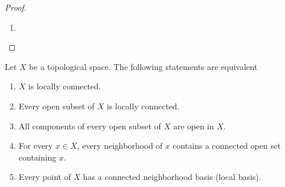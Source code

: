 \begin{proof}
\begin{enumerate}[label={(\alph*)}]
\begin{enumerate}[label={\textbf{Case \arabic*.}},itemindent=1cm]
			            There exists $\varepsilon > 0$ such that $\openinterval{t - \varepsilon, t + \varepsilon} \subseteq \halfopenleft{-1, 0}$. The open intervals $\openinterval{\tuple{x, t - \varepsilon}, \tuple{x, t + \varepsilon}}$ and $\openinterval{t - \varepsilon, t + \varepsilon}$ are homeomorphic due to the homeomorphism $\varphi: \openinterval{t - \varepsilon, t + \varepsilon} \to \openinterval{\tuple{x, t - \varepsilon}, \tuple{x, t + \varepsilon}}$ given by $\varphi(s) = \tuple{x, s}$.
			      \item $t = 0$ and $x > y_{0}$
			      \item $t = 0$ and $x = y_{0}$

			            For every $0 < \varepsilon < 1$, $\halfopenleft{\tuple{y_{0}, -\varepsilon}, \tuple{y_{0}, 0}} \vee \halfopenright{\tuple{y_{0}, 0}, \tuple{y_{0}, \varepsilon}}$ is a neighborhood of $\tuple{y_{0}, 0}$ that is homeomorphic to the open interval $\openinterval{-\varepsilon, \varepsilon} \subseteq \mathbb{R}$.
		      \end{enumerate}

		      Hence $\mathscr{R}_{+} \vee \mathscr{R}_{-}$ is locally Euclidean of dimension one.

		      \textbf{$\mathscr{R}_{+} \vee \mathscr{R}_{-}$ is Hausdorff.}

		      Consider two distinct points $\tuple{x_{1}, t_{1}}$ and $\tuple{x_{2}, t_{2}}$ of $\mathscr{R}_{+} \vee \mathscr{R}_{-}$

		      \textbf{$\mathscr{R}_{+} \vee \mathscr{R}_{-}$ is first countable.}

		      \textbf{$\mathscr{R}_{+} \vee \mathscr{R}_{-}$ is not second countable.}
		\item %
	\end{enumerate}
\end{proof}

\begin{note}\label{note:characterizations-of-local-connectedness}
	Let $X$ be a topological space. The following statements are equivalent
	\begin{enumerate}[label={(\alph*)}]
		\item $X$ is locally connected.
		\item Every open subset of $X$ is locally connected.
		\item All components of every open subset of $X$ are open in $X$.
		\item For every $x\in X$, every neighborhood of $x$ contains a connected open set containing $x$.
		\item Every point of $X$ has a connected neighborhood basis (local basis).
	\end{enumerate}
\end{note}

